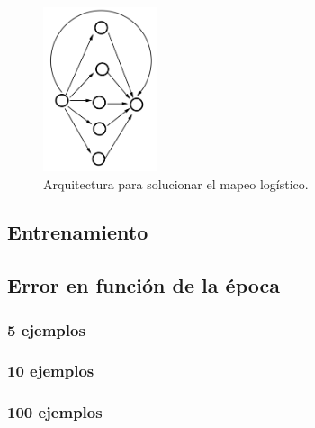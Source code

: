 \begin{figure}[H]
	\centering
	\includegraphics[width=0.3\textwidth]{ejer_3.png}
	\caption{Arquitectura para solucionar el mapeo logístico.}
	\label{fig:arq-mapeo}
\end{figure}

\subsection*{Entrenamiento}

\subsection*{Error en función de la época}

\subsubsection*{5 ejemplos}

\subsubsection*{10 ejemplos}

\subsubsection*{100 ejemplos}

